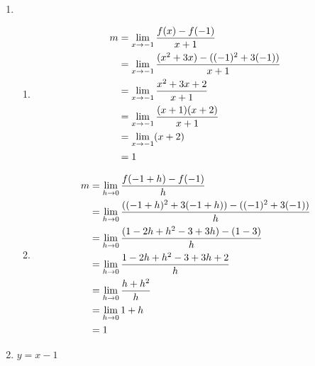 \documentclass{../../../classes/anal}
\begin{document}
    \begin{enumerate}[label={(\alph*)}]
        \item \begin{enumerate}[label={(\roman*)}]
            \item \begin{equation*}
                \begin{aligned}
                    m 
                    &= \lim_{x\to-1} {f(x) - f(-1) \over x + 1} \\
                    &= \lim_{x\to-1} {(x^2 + 3x) - ((-1)^2 + 3(-1)) \over x + 1} \\
                    &= \lim_{x\to-1} {x^2 + 3x + 2 \over x + 1} \\
                    &= \lim_{x\to-1} {(x + 1)(x + 2) \over x + 1} \\
                    &= \lim_{x\to-1} (x + 2) \\
                    &= 1
                \end{aligned}
            \end{equation*}
            \item \begin{equation*}
                \begin{aligned}
                    m
                    &= \lim_{h\to0} {f(-1 + h) - f(-1) \over h} \\ 
                    &= \lim_{h\to0} {((-1 + h)^2 + 3(-1 + h)) - ((-1)^2 + 3(-1)) \over h} \\ 
                    &= \lim_{h\to0} {(1 - 2h + h^2 - 3 + 3h) - (1 - 3) \over h} \\ 
                    &= \lim_{h\to0} {1 - 2h + h^2 - 3 + 3h + 2 \over h} \\ 
                    &= \lim_{h\to0} {h + h^2 \over h} \\ 
                    &= \lim_{h\to0} 1 + h \\ 
                    &= 1 \\ 
                \end{aligned}
            \end{equation*}
        \end{enumerate}
        \item \(y = x - 1\)
    \end{enumerate}

\end{document}
